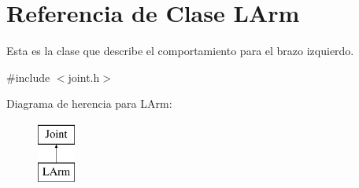 \hypertarget{class_l_arm}{\section{\-Referencia de \-Clase \-L\-Arm}
\label{class_l_arm}
}


\-Esta es la clase que describe el comportamiento para el brazo izquierdo.  




{\ttfamily \#include $<$joint.\-h$>$}

\-Diagrama de herencia para \-L\-Arm\-:\begin{figure}[H]
\begin{center}
\leavevmode
\includegraphics[height=2.000000cm]{class_l_arm}
\end{center}
\end{figure}
